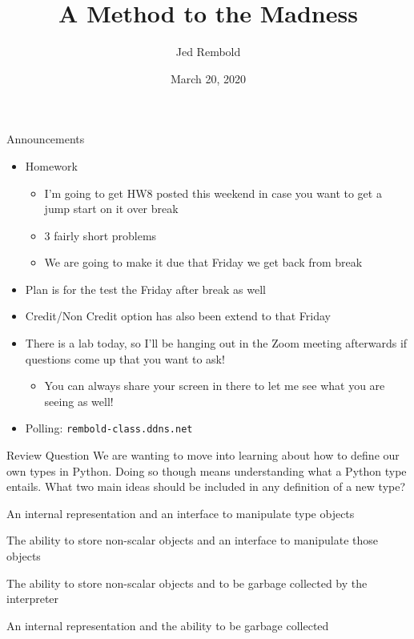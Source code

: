 \documentclass[pdf, aspectratio=169, 12pt]{beamer}
\title{A Method to the Madness}
\author{Jed Rembold}
\date{March 20, 2020}
\begin{document}
\begin{frame}{Announcements}
	\begin{itemize}
		\item Homework
			\begin{itemize}
				\item I'm going to get HW8 posted this weekend in case you want to get a jump start on it over break
				\item 3 fairly short problems
				\item We are going to make it due that Friday we get back from break
			\end{itemize}
		\item Plan is for the test the Friday after break as well
		\item Credit/Non Credit option has also been extend to that Friday
		\item There is a lab today, so I'll be hanging out in the Zoom meeting afterwards if questions come up that you want to ask!
			\begin{itemize}
				\item You can always share your screen in there to let me see what you are seeing as well!
			\end{itemize}
			
		\item Polling: \nolinkurl{rembold-class.ddns.net}
	\end{itemize}
\end{frame}

\begin{frame}{Review Question}
	We are wanting to move into learning about how to define our own types in Python. Doing so though means understanding what a Python type entails. What two main ideas should be included in any definition of a new type?
	\medskip
	\begin{poll}
		\item An internal representation and an interface to manipulate type objects
		\item The ability to store non-scalar objects and an interface to manipulate those objects
		\item The ability to store non-scalar objects and to be garbage collected by the interpreter
		\item An internal representation and the ability to be garbage collected
	\end{poll}
	
\end{frame}
\end{document}
